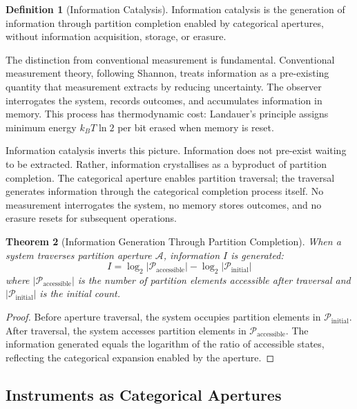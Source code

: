 \documentclass[twocolumn,10pt,a4paper]{article}
\newtheorem{theorem}{Theorem}[section]
\theoremstyle{definition}
\newtheorem{definition}[theorem]{Definition}
\theoremstyle{remark}
\newcommand{\partition}{\mathcal{P}}
\newcommand{\aperture}{\mathcal{A}}
\begin{document}
\begin{definition}[Information Catalysis]
\label{def:info_catalysis}
Information catalysis is the generation of information through partition completion enabled by categorical apertures, without information acquisition, storage, or erasure.
\end{definition}

The distinction from conventional measurement is fundamental. Conventional measurement theory, following Shannon, treats information as a pre-existing quantity that measurement extracts by reducing uncertainty. The observer interrogates the system, records outcomes, and accumulates information in memory. This process has thermodynamic cost: Landauer's principle assigns minimum energy $k_B T \ln 2$ per bit erased when memory is reset.

Information catalysis inverts this picture. Information does not pre-exist waiting to be extracted. Rather, information crystallises as a byproduct of partition completion. The categorical aperture enables partition traversal; the traversal generates information through the categorical completion process itself. No measurement interrogates the system, no memory stores outcomes, and no erasure resets for subsequent operations.

\begin{theorem}[Information Generation Through Partition Completion]
\label{thm:info_generation}
When a system traverses partition aperture $\aperture$, information $I$ is generated:
\begin{equation}
I = \log_2 |\partition_{\mathrm{accessible}}| - \log_2 |\partition_{\mathrm{initial}}|
\end{equation}
where $|\partition_{\mathrm{accessible}}|$ is the number of partition elements accessible after traversal and $|\partition_{\mathrm{initial}}|$ is the initial count.
\end{theorem}

\begin{proof}
Before aperture traversal, the system occupies partition elements in $\partition_{\mathrm{initial}}$. After traversal, the system accesses partition elements in $\partition_{\mathrm{accessible}}$. The information generated equals the logarithm of the ratio of accessible states, reflecting the categorical expansion enabled by the aperture.
\end{proof}

\subsection{Instruments as Categorical Apertures}
\end{document}
